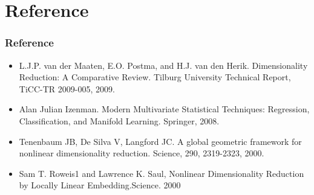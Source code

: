 \documentclass{beamer}
\begin{document}
\section{Reference}

\begin{frame}
\frametitle{Reference}
\begin{itemize}
\item L.J.P. van der Maaten, E.O. Postma, and H.J. van den Herik. Dimensionality Reduction: A Comparative Review. Tilburg University Technical Report, TiCC-TR 2009-005, 2009.
\item Alan Julian Izenman. Modern Multivariate Statistical Techniques: Regression, Classification, and
Manifold Learning. Springer, 2008.
\item Tenenbaum JB, De Silva V, Langford JC. A global geometric framework for nonlinear dimensionality reduction.
Science, 290, 2319-2323, 2000.
\item Sam T. Roweis1 and Lawrence K. Saul, Nonlinear Dimensionality Reduction by Locally Linear Embedding.Science. 2000 
\end{itemize}
\end{frame}
\end{document}
